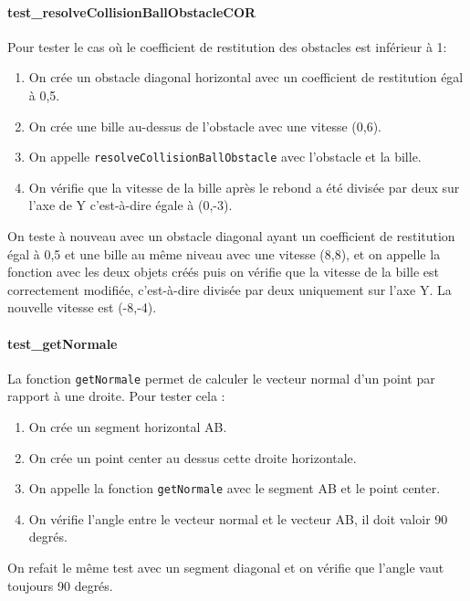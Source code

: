 \documentclass{report}
\begin{document}
\paragraph{test\_resolveCollisionBallObstacleCOR}

Pour tester le cas où le coefficient de restitution des obstacles est inférieur à 1:

\begin{enumerate}
\item On crée un obstacle diagonal horizontal avec un coefficient de restitution égal à 0,5.
\item On crée une bille au-dessus de l’obstacle avec une vitesse (0,6).
\item On appelle \texttt{resolveCollisionBallObstacle} avec l’obstacle et la bille.
\item On vérifie que la vitesse de la bille après le rebond a été divisée par deux sur l’axe de Y c’est-à-dire égale à (0,-3).
\end{enumerate}

On teste à nouveau avec un obstacle diagonal ayant un coefficient de restitution égal à 0,5 et une bille au même niveau avec une vitesse (8,8), et on appelle la fonction avec les deux objets créés puis on vérifie que la vitesse de la bille est correctement modifiée, c’est-à-dire divisée par deux uniquement sur l’axe Y. La nouvelle vitesse est (-8,-4).

\paragraph{test\_getNormale}

La fonction \texttt{getNormale} permet de calculer le vecteur normal d’un point par rapport à une droite. Pour tester cela :

\begin{enumerate}
\item On crée un segment horizontal AB.
\item On crée un point center au dessus cette droite horizontale.
\item On appelle la fonction \texttt{getNormale} avec le segment AB et le point center.
\item On vérifie l’angle entre le vecteur normal et le vecteur AB, il doit valoir 90 degrés.
\end{enumerate}

On refait le même test avec un segment diagonal et on vérifie que l’angle vaut toujours 90 degrés.
\end{document}
